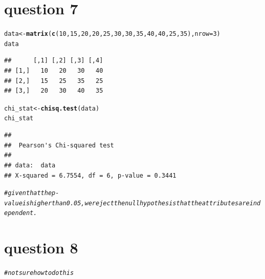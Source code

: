 \documentclass{article}\usepackage[]{graphicx}\usepackage[]{xcolor}
\makeatletter
\newcommand{\hlnum}[1]{\textcolor[rgb]{0.686,0.059,0.569}{#1}}%
\newcommand{\hlcom}[1]{\textcolor[rgb]{0.678,0.584,0.686}{\textit{#1}}}%
\newcommand{\hldef}[1]{\textcolor[rgb]{0.345,0.345,0.345}{#1}}%
\newcommand{\hlkwb}[1]{\textcolor[rgb]{0.69,0.353,0.396}{#1}}%
\newcommand{\hlkwc}[1]{\textcolor[rgb]{0.333,0.667,0.333}{#1}}%
\newcommand{\hlkwd}[1]{\textcolor[rgb]{0.737,0.353,0.396}{\textbf{#1}}}%
\newenvironment{kframe}{%
 \def\at@end@of@kframe{}%
 \ifinner\ifhmode%
  \def\at@end@of@kframe{\end{minipage}}%
  \begin{minipage}{\columnwidth}%
 \fi\fi%
 \def\FrameCommand##1{\hskip\@totalleftmargin \hskip-\fboxsep
 \colorbox{shadecolor}{##1}\hskip-\fboxsep
     \hskip-\linewidth \hskip-\@totalleftmargin \hskip\columnwidth}%
 \MakeFramed {\advance\hsize-\width
   \@totalleftmargin\z@ \linewidth\hsize
   \@setminipage}}%
 {\par\unskip\endMakeFramed%
 \at@end@of@kframe}
\newenvironment{knitrout}{}{} %
\makeatother
\begin{document}
\section{question 7}
\begin{knitrout}
\color{fgcolor}\begin{kframe}
\begin{alltt}
\hldef{data} \hlkwb{<-} \hlkwd{matrix}\hldef{(}\hlkwd{c}\hldef{(}\hlnum{10}\hldef{,} \hlnum{15}\hldef{,}\hlnum{20}\hldef{,} \hlnum{20}\hldef{,} \hlnum{25}\hldef{,}\hlnum{30}\hldef{,} \hlnum{30}\hldef{,} \hlnum{35}\hldef{,} \hlnum{40}\hldef{,} \hlnum{40}\hldef{,} \hlnum{25}\hldef{,} \hlnum{35}\hldef{),} \hlkwc{nrow} \hldef{=} \hlnum{3}\hldef{)}
\hldef{data}
\end{alltt}
\begin{verbatim}
##      [,1] [,2] [,3] [,4]
## [1,]   10   20   30   40
## [2,]   15   25   35   25
## [3,]   20   30   40   35
\end{verbatim}
\begin{alltt}
\hldef{chi_stat} \hlkwb{<-} \hlkwd{chisq.test}\hldef{(data)}
\hldef{chi_stat}
\end{alltt}
\begin{verbatim}
## 
## 	Pearson's Chi-squared test
## 
## data:  data
## X-squared = 6.7554, df = 6, p-value = 0.3441
\end{verbatim}
\begin{alltt}
\hlcom{# given that the p-value is higher than 0.05, we reject the null hypothesis that the attributes are independent.}
\end{alltt}
\end{kframe}
\end{knitrout}

\section{question 8}

\begin{knitrout}
\color{fgcolor}\begin{kframe}
\begin{alltt}
\hlcom{# not sure how to do this}
\end{alltt}
\end{kframe}
\end{knitrout}
\end{document}
